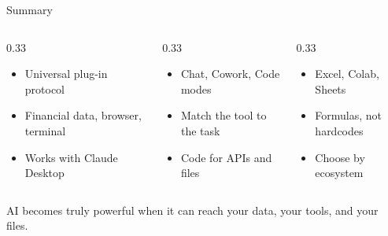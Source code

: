 \documentclass[aspectratio=169]{beamer}
\begin{document}
\begin{frame}{Summary}
\begin{columns}[T]
\begin{column}{0.33\textwidth}
\begin{shadedbox}[title=\textbf{MCP}]
\begin{itemize}\small
  \item Universal plug-in protocol
  \item Financial data, browser, terminal
  \item Works with Claude Desktop
\end{itemize}
\end{shadedbox}
\end{column}
\begin{column}{0.33\textwidth}
\begin{shadedbox}[title=\textbf{Code Execution}]
\begin{itemize}\small
  \item Chat, Cowork, Code modes
  \item Match the tool to the task
  \item Code for APIs and files
\end{itemize}
\end{shadedbox}
\end{column}
\begin{column}{0.33\textwidth}
\begin{shadedbox}[title=\textbf{AI in Apps}]
\begin{itemize}\small
  \item Excel, Colab, Sheets
  \item Formulas, not hardcodes
  \item Choose by ecosystem
\end{itemize}
\end{shadedbox}
\end{column}
\end{columns}
\vspace{0.5cm}
\begin{center}
\alert{AI becomes truly powerful when it can reach your data, your tools, and your files.}
\end{center}
\end{frame}
\end{document}
